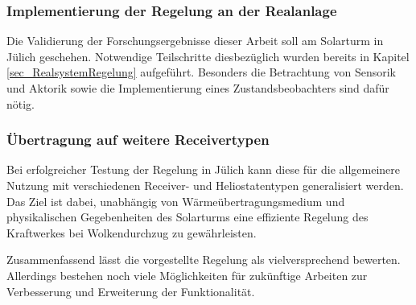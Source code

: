 \subsubsection*{Implementierung der Regelung an der Realanlage}
Die Validierung der Forschungsergebnisse dieser Arbeit soll am Solarturm in Jülich geschehen.
Notwendige Teilschritte diesbezüglich wurden bereits in Kapitel \ref{sec_RealsystemRegelung} aufgeführt.
Besonders die Betrachtung von Sensorik und Aktorik sowie die Implementierung eines Zustandsbeobachters sind dafür nötig.

\subsubsection*{Übertragung auf weitere Receivertypen}
Bei erfolgreicher Testung der Regelung in Jülich kann diese für die allgemeinere Nutzung mit verschiedenen Receiver- und Heliostatentypen generalisiert werden.
Das Ziel ist dabei, unabhängig von Wärmeübertragungsmedium und physikalischen Gegebenheiten des Solarturms eine effiziente Regelung des Kraftwerkes bei Wolkendurchzug zu gewährleisten.

Zusammenfassend lässt die vorgestellte Regelung als vielversprechend bewerten.
Allerdings bestehen noch viele Möglichkeiten für zukünftige Arbeiten zur Verbesserung und Erweiterung der Funktionalität.
